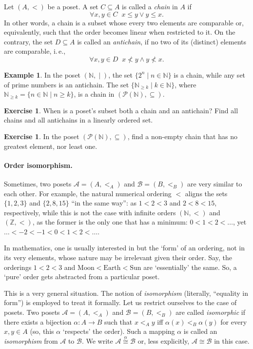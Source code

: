 \documentclass[12pt,notitlepage]{article}
\theoremstyle{plain}
\theoremstyle{definition}
\newtheorem{exc}[thm]{Exercise}
\newtheorem{exm}[thm]{Example}
\theoremstyle{plain}
\newcommand{\N}{\mathbb{N}}
\newcommand{\Z}{\mathbb{Z}}
\newcommand{\sbs}{\subseteq}
\newcommand{\mP}{\mathcal{P}}
\newcommand{\1}{\mathbf{1}}
\newcommand{\0}{\mathbf{0}}
\newcommand{\dvd}{\mathop{\mid}}
\begin{document}
Let $(A,<)$ be a poset. A set $C \sbs A$ is called a \emph{chain} in $A$ if
$$\forall x, y \in C\;\; x \leq y \vee y \leq x.$$
In other words, a chain is a subset whose every two elements are comparable or, equivalently, such that the order becomes linear when restricted to it. On the contrary, the set $D \sbs A$ is called an \emph{antichain}, if no two of its (distinct) elements are comparable, i.\,e.,
$$\forall x, y \in D\;\; x \nless y \wedge y \nless x.$$
\begin{exm}
In the poset $(\N, {\dvd})$, the set $\{2^n \mid n \in \N \}$ is a chain, while any set of prime numbers is an antichain. The set $\{ \N_{\geq k} \mid k \in \N \}$, where $\N_{\geq k} = \{ n \in \N\mid n \geq k \}$, is a chain in $(\mP(\N), {\sbs})$.
\end{exm}
\begin{exc}
When is a poset's subset both a chain and an antichain? Find all chains and all antichains in a linearly ordered set.
\end{exc}
\begin{exc}
In the poset $(\mP(\N), \sbs)$, find a non-empty chain that has no greatest element, nor least one.
\end{exc}

\paragraph{Order isomorphism.} Sometimes, two posets $\mathcal A = (A, <_A)$ and $\mathcal B = (B, <_B)$ are very similar to each other. For example, the natural numerical ordering $<$ aligns the sets $\{1,2,3\}$ and $\{2, 8, 15\}$ ``in the same way'': as $1 < 2 < 3$ and $2 < 8 < 15$, respectively, while this is not the case with infinite orders $(\N, <)$ and $(\Z, <)$, as the former is the only one that has a minimum: $0 < 1 < 2 < \ldots$, yet $\ldots < -2 < -1 < 0 < 1 < 2 < \ldots$.

In mathematics, one is usually interested in but the `form' of an ordering, not in its very elements, whose nature may be irrelevant given their order. Say, the orderings $1 < 2 < 3$ and $\mbox{Moon} < \mbox{Earth} < \mbox{Sun}$ are `essentially' the same. So, a `pure' order gets abstracted from a particular poset.

This is a very general situation. The notion of \emph{isomorphism} (literally, ``equality in form'') is employed to treat it formally. Let us restrict ourselves to the case of posets. Two posets $\mathcal A = (A, <_A)$ and $\mathcal B = (B, <_B)$ are called \emph{isomorphic} if there exists a bijection $\alpha\colon A \to B$ such that $x <_A y$ iff $\alpha(x) <_B \alpha(y)$ for every $x, y \in A$ (so, this $\alpha$ `respects' the order). Such a mapping $\alpha$ is called an \emph{isomorphism} from $\mathcal A$ to $\mathcal B$. We write $\mathcal A \stackrel{\alpha}{\cong} \mathcal B$ or, less explicitly, $\mathcal A \cong \mathcal B$ in this case.
\end{document}

